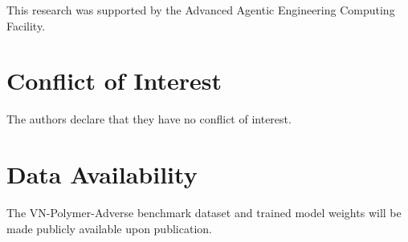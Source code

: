 \documentclass[twocolumn]{svjour3}
\begin{document}
\begin{acknowledgements}
This research was supported by the Advanced Agentic Engineering Computing Facility.
\end{acknowledgements}

\section*{Conflict of Interest}
The authors declare that they have no conflict of interest.

\section*{Data Availability}
The VN-Polymer-Adverse benchmark dataset and trained model weights will be made publicly available upon publication.



\end{document}
